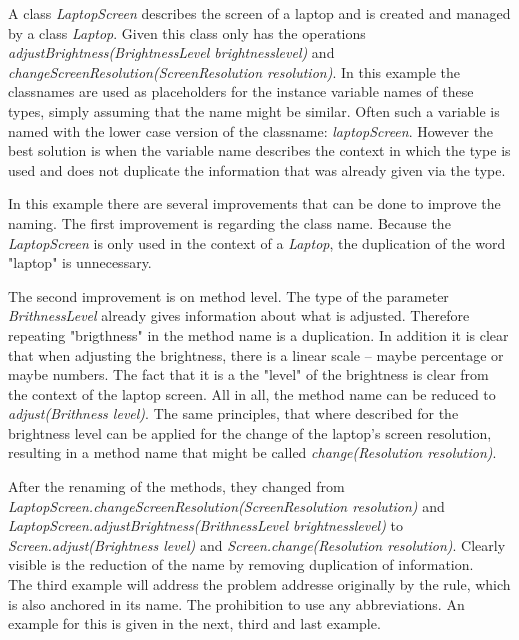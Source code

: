 A class \textit{LaptopScreen} describes the screen of a laptop and is created and managed by a class \textit{Laptop}. Given this class only has the operations \textit{adjustBrightness(BrightnessLevel brightnesslevel)} and \textit{changeScreenResolution(ScreenResolution resolution)}. In this example the classnames are used as placeholders for the instance variable names of these types, simply assuming that the name might be similar. Often such a variable is named with the lower case version of the classname: \textit{laptopScreen}. However the best solution is when the variable name describes the context in which the type is used and does not duplicate the information that was already given via the type.  

In this example there are several improvements that can be done to improve the naming. The first improvement is regarding the class name. Because the \textit{LaptopScreen} is only used in the context of a \textit{Laptop}, the duplication of the word "laptop" is unnecessary.

The second improvement is on method level. The type of the parameter \textit{BrithnessLevel} already gives information about what is adjusted. Therefore repeating "brigthness" in the method name is a duplication. In addition it is clear that when adjusting the brightness, there is a linear scale -- maybe percentage or maybe numbers. The fact that it is a the "level" of the brightness is clear from the context of the laptop screen. All in all, the method name can be reduced to \textit{adjust(Brithness level)}. The same principles, that where described for the brightness level can be applied for the change of the laptop's screen resolution, resulting in a method name that might be called \textit{change(Resolution resolution)}.

After the renaming of the methods, they changed from \\ \textit{LaptopScreen.changeScreenResolution(ScreenResolution resolution)}  and \\\textit{LaptopScreen.adjustBrightness(BrithnessLevel brightnesslevel)} to \textit{Screen.adjust(Brightness level)} and \textit{Screen.change(Resolution resolution)}. Clearly visible is the reduction of the name by removing duplication of information. 
\\

The third example will address the problem addresse originally by the rule, which is also anchored in its name. The prohibition to use any abbreviations. An example for this is given in the next, third and last example. 

